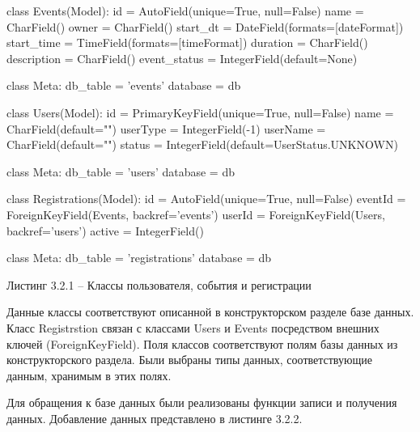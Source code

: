 \documentclass[12pt,a4paper,oneside]{report}
\begin{document}
\begin{python}
class Events(Model):
    id = AutoField(unique=True, null=False)
    name = CharField()
    owner = CharField()
    start_dt = DateField(formats=[dateFormat])
    start_time = TimeField(formats=[timeFormat])
    duration = CharField()
    description = CharField()
    event_status = IntegerField(default=None)

    class Meta:
        db_table = 'events'
        database = db
        
    class Users(Model):
    id = PrimaryKeyField(unique=True, null=False)
    name = CharField(default="")
    userType = IntegerField(-1)
    userName = CharField(default="")
    status = IntegerField(default=UserStatus.UNKNOWN)

    class Meta:
        db_table = 'users'
        database = db


class Registrations(Model):
    id = AutoField(unique=True, null=False)
    eventId = ForeignKeyField(Events, backref='events')
    userId = ForeignKeyField(Users, backref='users')
    active = IntegerField()

    class Meta:
        db_table = 'registrations'
        database = db
\end{python}

\begin{center}
    Листинг 3.2.1 – Классы пользователя, события и регистрации
\end{center}

Данные классы соответствуют описанной в конструкторском разделе базе данных. Класс Registrstion связан с классами Users и Events посредством внешних ключей (ForeignKeyField). Поля классов соответствуют полям базы данных из конструкторского раздела. Были выбраны типы данных, соответствующие данным, хранимым в этих полях.

Для обращения к базе данных были реализованы функции записи и получения данных. Добавление данных представлено в листинге 3.2.2.
\end{document}
